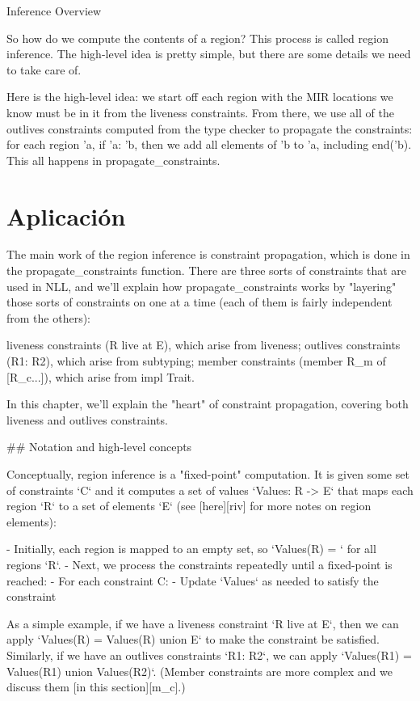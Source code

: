 \documentclass[12pt, a4paper]{article}
\begin{document}
Inference Overview

So how do we compute the contents of a region? This process is called region inference. The high-level idea is pretty simple, but there are some details we need to take care of.

Here is the high-level idea: we start off each region with the MIR locations we know must be in it from the liveness constraints. From there, we use all of the outlives constraints computed from the type checker to propagate the constraints: for each region 'a, if 'a: 'b, then we add all elements of 'b to 'a, including end('b). This all happens in propagate_constraints.

\section{Aplicación}

The main work of the region inference is constraint propagation, which is done in the propagate_constraints function. There are three sorts of constraints that are used in NLL, and we'll explain how propagate_constraints works by "layering" those sorts of constraints on one at a time (each of them is fairly independent from the others):

    liveness constraints (R live at E), which arise from liveness;
    outlives constraints (R1: R2), which arise from subtyping;
    member constraints (member R_m of [R_c...]), which arise from impl Trait.

In this chapter, we'll explain the "heart" of constraint propagation, covering both liveness and outlives constraints.

## Notation and high-level concepts

Conceptually, region inference is a "fixed-point" computation. It is
given some set of constraints `{C}` and it computes a set of values
`Values: R -> {E}` that maps each region `R` to a set of elements
`{E}` (see [here][riv] for more notes on region elements):

- Initially, each region is mapped to an empty set, so `Values(R) =
  {}` for all regions `R`.
- Next, we process the constraints repeatedly until a fixed-point is reached:
  - For each constraint C:
    - Update `Values` as needed to satisfy the constraint

As a simple example, if we have a liveness constraint `R live at E`,
then we can apply `Values(R) = Values(R) union {E}` to make the
constraint be satisfied. Similarly, if we have an outlives constraints
`R1: R2`, we can apply `Values(R1) = Values(R1) union Values(R2)`.
(Member constraints are more complex and we discuss them [in this section][m_c].)
\end{document}
